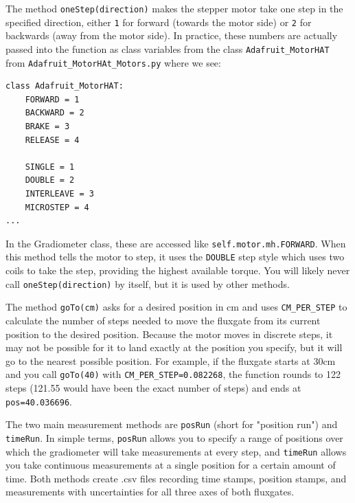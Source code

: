 \documentclass{TheMartianReport}
\newcommand{\pyinline}[1]{\texttt{#1}}
\newcommand{\shellinline}[1]{\texttt{#1}}
\begin{document}
The method \pyinline{oneStep(direction)} makes the stepper motor take one step in the specified direction, either \pyinline{1} for forward (towards the motor side) or \pyinline{2} for backwards (away from the motor side). In practice, these numbers are actually passed into the function as class variables from the class \pyinline{Adafruit_MotorHAT} from \shellinline{Adafruit_MotorHAt_Motors.py} where we see:

\begin{verbatim}
class Adafruit_MotorHAT:
    FORWARD = 1
    BACKWARD = 2
    BRAKE = 3
    RELEASE = 4

    SINGLE = 1
    DOUBLE = 2
    INTERLEAVE = 3
    MICROSTEP = 4
...
\end{verbatim}
In the Gradiometer class, these are accessed like \pyinline{self.motor.mh.FORWARD}. When this method tells the motor to step, it uses the \pyinline{DOUBLE} step style which uses two coils to take the step, providing the highest available torque. You will likely never call \pyinline{oneStep(direction)} by itself, but it is used by other methods.

The method \pyinline{goTo(cm)} asks for a desired position in cm and uses \pyinline{CM_PER_STEP} to calculate the number of steps needed to move the fluxgate from its current position to the desired position. Because the motor moves in discrete steps, it may not be possible for it to land exactly at the position you specify, but it will go to the nearest possible position. For example, if the fluxgate starts at 30cm and you call \pyinline{goTo(40)} with \pyinline{CM_PER_STEP=0.082268}, the function rounds to 122 steps (121.55 would have been the exact number of steps) and ends at \pyinline{pos=40.036696}. 


The two main measurement methods are \pyinline{posRun} (short for "position run") and \pyinline{timeRun}. In simple terms, \pyinline{posRun} allows you to specify a range of positions over which the gradiometer will take measurements at every step, and \pyinline{timeRun} allows you take continuous measurements at a single position for a certain amount of time. Both methods create .csv files recording time stamps, position stamps, and measurements with uncertainties for all three axes of both fluxgates.
\end{document}
